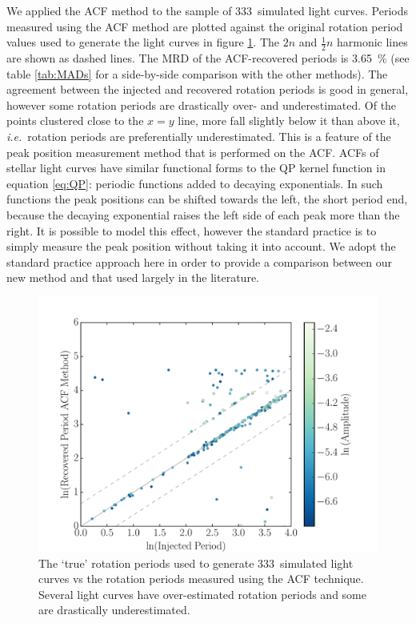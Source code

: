 \documentclass[useAMS, usenatbib, preprint, 12pt]{aastex}
\newcommand{\ie}{{\it i.e.}}
\newcommand{\naigrain}{333}
\newcommand{\percentacfMAD}{3.65}
\begin{document}
We applied the ACF method to the sample of \naigrain\ simulated light
curves.
Periods measured using the ACF method are plotted against the original
rotation period values used to generate the light curves in figure
\ref{fig:compare_acf}.
The $2n$ and $\frac{1}{2}n$ harmonic lines are shown as dashed lines.
The MRD of the ACF-recovered periods is \percentacfMAD\ \% (see table
\ref{tab:MADs} for a side-by-side comparison with the other methods).
The agreement between the injected and recovered rotation periods is good in
general, however some rotation periods are drastically over- and
underestimated.
Of the points clustered close to the $x=y$ line, more fall slightly below it
than above it, \ie\ rotation periods are preferentially underestimated.
This is a feature of the peak position measurement method that is performed on
the ACF.
ACFs of stellar light curves have similar functional forms to the QP kernel
function in equation \ref{eq:QP}: periodic functions added to decaying
exponentials.
In such functions the peak positions can be shifted towards the left, the
short period end, because the decaying exponential raises the left side of
each peak more than the right.
It is possible to model this effect, however the standard practice is to
simply measure the peak position without taking it into account.
We adopt the standard practice approach here in order to provide a comparison
between our new method and that used largely in the literature.

\begin{figure}
\begin{center}
\includegraphics[width=6in, clip=true]{figures/compare_acf.pdf}
\caption[ACF results.]
{The `true' rotation periods used to generate \naigrain\ simulated light
curves vs the rotation periods measured using the ACF technique.
    Several light curves have over-estimated rotation periods and some
    are drastically underestimated.}
\label{fig:compare_acf}
\end{center}
\end{figure}
\end{document}

